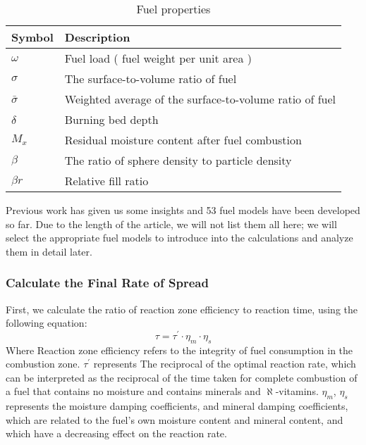 \documentclass[12pt]{article}  %
\begin{document}
\begin{table}[htbp]
	\begin{center}
		\caption{Fuel properties}
		\begin{tabular}{m{1.5cm} m{9cm}}
			\toprule[2pt]
			\multicolumn{1}{m{3cm}}{\centering Symbol}
			&\multicolumn{1}{m{9cm}}{\centering Description }\\
			\midrule
			$\omega$& Fuel load ( fuel weight per unit area ) \\
			\vspace{2pt}
			$\sigma$& The surface-to-volume ratio of fuel \\
			\vspace{2pt}
			$\bar{\sigma}$ & Weighted average of the surface-to-volume ratio of fuel\\
			\vspace{2pt}
			$\delta$& Burning bed depth\\
			\vspace{2pt}
			$M_x$& Residual moisture content after fuel combustion \\
			\vspace{2pt}
			$\beta$& The ratio of sphere density to particle density \\
			\vspace{2pt}
			$\beta r$& Relative fill ratio \\

	 		\bottomrule[2pt]
			\end{tabular}
		\label{properties} 
	\end{center}
\end{table}


Previous work has given us some insights and 53 fuel models have been developed so far.\cite{4} Due to the length of the article, we will not list them all here; we will select the appropriate fuel models to introduce into the calculations and analyze them in detail later.

\subsubsection{Calculate the Final Rate of Spread}

First, we calculate the ratio of reaction zone efficiency to reaction time, using the following equation:
\begin{equation}
	\tau=\tau^{\prime}{ }\cdot \eta_m\cdot \eta_s
\end{equation}
Where Reaction zone efficiency refers to the integrity of fuel consumption in the combustion zone. $\tau^{\prime}$ represents The reciprocal of the optimal reaction rate, which can be interpreted as the reciprocal of the time taken for complete combustion of a fuel that contains no moisture and contains minerals and $\aleph$-vitamins. $\eta_m$, $\eta_s$ represents the moisture damping coefficients, and mineral damping coefficients, which are related to the fuel's own moisture content and mineral content, and which have a decreasing effect on the reaction rate.
\end{document}
